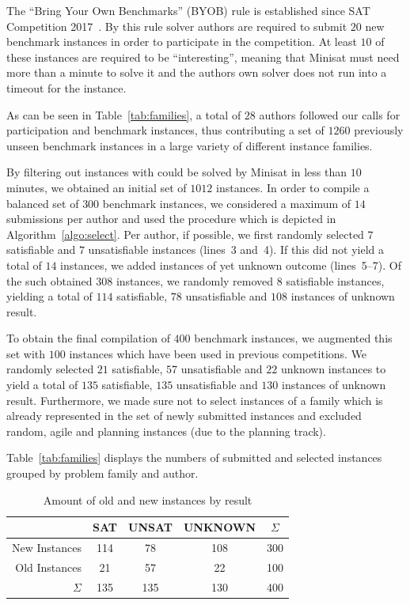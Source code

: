 \documentclass{elsarticle}
\begin{document}
The ``Bring Your Own Benchmarks'' (BYOB) rule is established since SAT Competition 2017~\cite{SC2017}. 
By this rule solver authors are required to submit $20$ new benchmark instances in order to participate in the competition. At least $10$ of these instances are required to be ``interesting'', meaning that Minisat must need more than a minute to solve it and the authors own solver does not run into a timeout for the instance. 

As can be seen in Table~\ref{tab:families}, a total of $28$ authors followed our calls for participation and benchmark instances, thus contributing a set of $1260$ previously unseen benchmark instances in a large variety of different instance families. 

By filtering out instances with could be solved by Minisat in less than $10$ minutes, we obtained an initial set of $1012$ instances. 
In order to compile a balanced set of $300$ benchmark instances, we considered a maximum of $14$ submissions per author and used the procedure which is depicted in Algorithm~\ref{algo:select}. 
Per author, if possible, we first randomly selected $7$ satisfiable and $7$ unsatisfiable instances (lines~3 and~4). 
If this did not yield a total of $14$ instances, we added instances of yet unknown outcome (lines~5--7). 
Of the such obtained $308$ instances, we randomly removed $8$ satisfiable instances, yielding a total of $114$ satisfiable, $78$ unsatisfiable and $108$ instances of unknown result. 

To obtain the final compilation of $400$ benchmark instances, we augmented this set with $100$ instances which have been used in previous competitions. 
We randomly selected $21$ satisfiable, $57$ unsatisfiable and $22$ unknown instances to yield a total of $135$ satisfiable, $135$ unsatisfiable and $130$ instances of unknown result. 
Furthermore, we made sure not to select instances of a family which is already represented in the set of newly submitted instances and excluded random, agile and planning instances (due to the planning track). 

Table~\ref{tab:families} displays the numbers of submitted and selected instances grouped by problem family and author. 

\begin{table}[t]
\centering
\begin{tabular}{|r|ccc|c|}
\hline
 & SAT & UNSAT & UNKNOWN & $\Sigma$\\
\hline\hline
New Instances & 114 & 78 & 108 & 300 \\
Old Instances & 21 & 57 & 22 & 100\\
\hline
$\Sigma$ & 135 & 135 & 130 & 400\\
\hline
\end{tabular}
\caption{Amount of old and new instances by result}
\label{tab:final}
\end{table}
\end{document}
